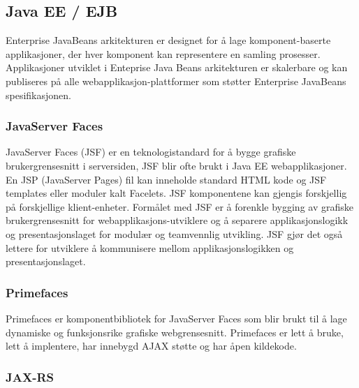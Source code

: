 \documentclass[../main.tex]{subfiles}
\begin{document}
\subsection{Java EE / EJB}

Enterprise JavaBeans arkitekturen er designet for å lage komponent-baserte applikasjoner, der hver komponent kan representere en samling prosesser. Applikasjoner utviklet i Enteprise Java Beans arkitekturen er skalerbare og kan publiseres på alle webapplikasjon-plattformer som støtter Enterprise JavaBeans spesifikasjonen. 

\subsubsection{JavaServer Faces}

JavaServer Faces (JSF) er en teknologistandard for å bygge grafiske brukergrensesnitt i serversiden, JSF blir ofte brukt i Java EE webapplikasjoner. En JSP (JavaServer Pages) fil kan inneholde standard HTML kode og JSF templates eller moduler kalt Facelets. JSF komponentene kan gjengis forskjellig på forskjellige klient-enheter. Formålet med JSF er å forenkle bygging av grafiske brukergrensesnitt for webapplikasjons-utviklere og å separere applikasjonslogikk og presentasjonslaget for modulær og teamvennlig utvikling. JSF gjør det også lettere for utviklere å kommunisere mellom applikasjonslogikken og presentasjonslaget.  

\subsubsection{Primefaces}

Primefaces er komponentbibliotek for JavaServer Faces som blir brukt til å lage dynamiske og funksjonsrike grafiske webgrensesnitt. Primefaces er lett å bruke, lett å implentere, har innebygd AJAX støtte og har åpen kildekode. 

\subsubsection{JAX-RS}
\end{document}
